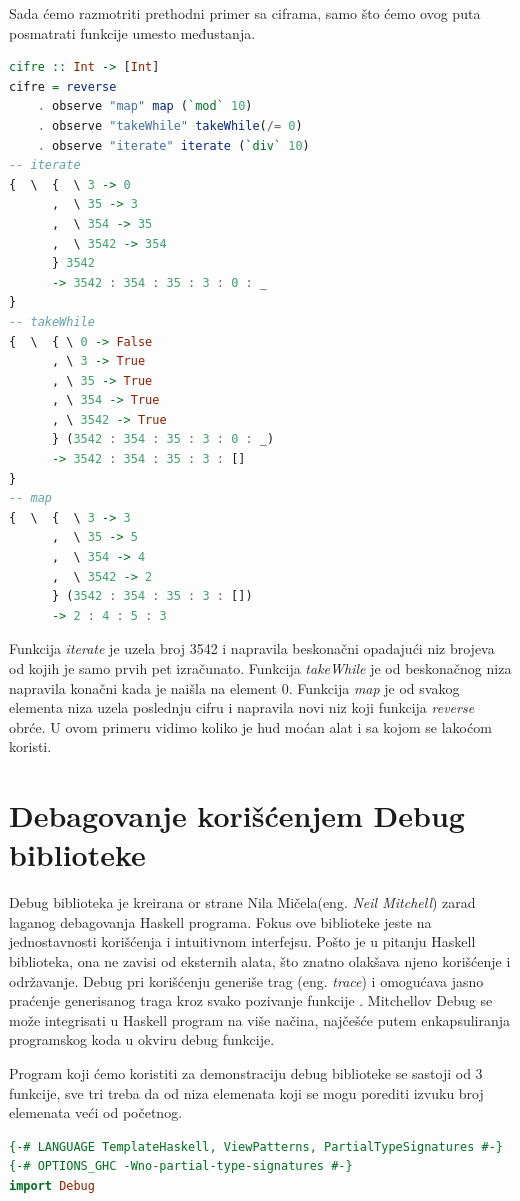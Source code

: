 \documentclass[a4paper]{article}
\begin{document}
{Sada ćemo razmotriti prethodni primer sa ciframa, samo što ćemo ovog puta posmatrati funkcije umesto međustanja.
\begin{lstlisting}[language=Haskell]
cifre :: Int -> [Int]
cifre = reverse 
	. observe "map" map (`mod` 10)
	. observe "takeWhile" takeWhile(/= 0)
	. observe "iterate" iterate (`div` 10)
-- iterate 
{  \  {  \ 3 -> 0
      ,  \ 35 -> 3
      ,  \ 354 -> 35
      ,  \ 3542 -> 354
      } 3542
      -> 3542 : 354 : 35 : 3 : 0 : _
}
-- takeWhile
{  \  { \ 0 -> False
      , \ 3 -> True
      , \ 35 -> True
      , \ 354 -> True
      , \ 3542 -> True
      } (3542 : 354 : 35 : 3 : 0 : _)
      -> 3542 : 354 : 35 : 3 : []
}
-- map
{  \  {  \ 3 -> 3
      ,  \ 35 -> 5
      ,  \ 354 -> 4
      ,  \ 3542 -> 2  
      } (3542 : 354 : 35 : 3 : [])
      -> 2 : 4 : 5 : 3
\end{lstlisting}
Funkcija {\em iterate} je uzela broj 3542 i napravila beskonačni opadajući niz brojeva od kojih je samo prvih pet izračunato.
Funkcija {\em takeWhile} je od beskonačnog niza napravila konačni kada je naišla na element 0.
Funkcija {\em map} je od svakog elementa niza uzela poslednju cifru i napravila novi niz koji funkcija {\em reverse} obrće.
U ovom primeru vidimo koliko je hud moćan alat i sa kojom se lakoćom koristi.

\section{Debagovanje korišćenjem Debug biblioteke}
Debug biblioteka je kreirana or strane Nila Mičela(eng. {\em Neil Mitchell}) zarad laganog debagovanja Haskell programa. Fokus ove biblioteke jeste na jednostavnosti korišćenja i intuitivnom interfejsu. Pošto je u pitanju Haskell biblioteka, ona ne zavisi od eksternih alata, što znatno olakšava njeno korišćenje i održavanje. Debug pri korišćenju generiše trag (eng. {\em trace}) i omogućava jasno praćenje generisanog traga kroz svako pozivanje funkcije \cite{chitil2002transforming}.
Mitchellov Debug se može integrisati u Haskell program na više načina, najčešće putem enkapsuliranja programskog koda u okviru debug funkcije. 

Program koji ćemo koristiti za demonstraciju debug biblioteke se sastoji od 3 funkcije, sve tri treba da od niza elemenata koji se mogu porediti izvuku broj elemenata veći od početnog.

\begin{lstlisting}[caption={Okružujemo naš kod funkcijom debug, iz biblioteke Debug, sa uključivanjem ekstenzija navedenih u prvom redu}, language=Haskell]
{-# LANGUAGE TemplateHaskell, ViewPatterns, PartialTypeSignatures #-}
{-# OPTIONS_GHC -Wno-partial-type-signatures #-}
import Debug


\end{lstlisting}}
\end{document}
